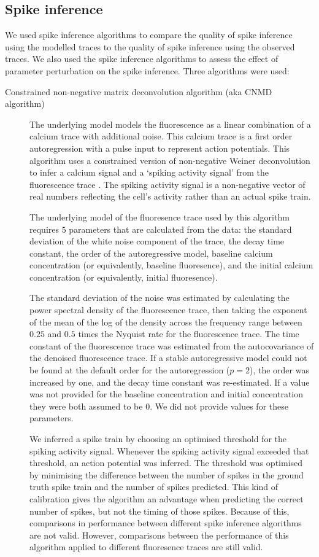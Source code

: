 \subsection{Spike inference}
We used spike inference algorithms to compare the quality of spike inference using the modelled traces to the quality of spike inference using the observed traces. We also used the spike inference algorithms to assess the effect of parameter perturbation on the spike inference. Three algorithms were used:
\begin{description}
    \item[Constrained non-negative matrix deconvolution algorithm (aka CNMD algorithm)] The underlying model models the fluorescence as a linear combination of a calcium trace with additional noise. This calcium trace is a first order autoregression with a pulse input to represent action potentials. This algorithm uses a constrained version of non-negative Weiner deconvolution to infer a calcium signal and a `spiking activity signal' from the fluorescence trace \parencite{vogelstein, pnevmatikakis}. The spiking activity signal is a non-negative vector of real numbers reflecting the cell's activity rather than an actual spike train.

    The underlying model of the fluoresence trace used by this algorithm requires $5$ parameters that are calculated from the data: the standard deviation of the white noise component of the trace, the decay time constant, the order of the autoregressive model, baseline calcium concentration (or equivalently, baseline fluoresence), and the initial calcium concentration (or equivalently, initial fluoresence).

    The standard deviation of the noise was estimated by calculating the power spectral density of the fluorescence trace, then taking the exponent of the mean of the log of the density across the frequency range between $0.25$ and $0.5$ times the Nyquist rate for the fluorescence trace. The time constant of the fluorescence trace was estimated from the autocovariance of the denoised fluorescence trace. If a stable autoregressive model could not be found at the default order for the autoregression ($p=2$), the order was increased by one, and the decay time constant was re-estimated. If a value was not provided for the baseline concentration and initial concentration they were both assumed to be $0$. We did not provide values for these parameters.

    We inferred a spike train by choosing an optimised threshold for the spiking activity signal. Whenever the spiking activity signal exceeded that threshold, an action potential was inferred. The threshold was optimised by minimising the difference between the number of spikes in the ground truth spike train and the number of spikes predicted. This kind of calibration gives the algorithm an advantage when predicting the correct number of spikes, but not the timing of those spikes. Because of this, comparisons in performance between different spike inference algorithms are not valid. However, comparisons between the performance of this algorithm applied to different fluoresence traces are still valid.


\end{description}

